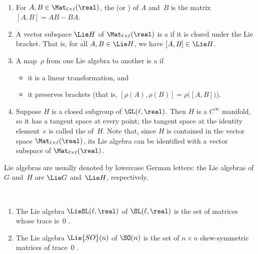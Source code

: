 \begin{defns} \ 
\noprelistbreak
	\begin{enumerate}

	\item For $A,B \in \Mat_{\ell \times \ell}(\real)$, the  (or ) of $A$ and~$B$ is the matrix
		$ [A,B] = AB - BA $.
	\item A vector subspace $\Lie H$ of $\Mat_{\ell \times \ell}(\real)$ is a  if it is closed under the Lie bracket. That is, for all $A,B \in \Lie H$, we have $[A,B] \in \Lie H$.
	\item A map~$\rho$ from one Lie algebra to another is a 
	if
		\begin{itemize}
		\item it is a linear transformation,
		and
		\item it preserves brackets (that is, $[\rho(A), \rho(B)] = \rho \bigl( [A,B] \bigr)$).
		\end{itemize}
	\item Suppose $H$ is a closed subgroup of $\GL(\ell,\real)$. Then $H$ is a $C^\infty$ manifold, so it has a tangent space at every point; the tangent space at the identity element~$e$ is called the  of~$H$. Note that, since $H$ is contained in the vector space $\Mat_{\ell \times \ell}(\real)$, its Lie algebra can be identified with a vector subspace of $\Mat_{\ell \times \ell}(\real)$.
	\end{enumerate}
\end{defns}

\begin{notation}
Lie algebras are usually denoted by lowercase German letters: the Lie algebras of $G$ and~$H$ are 
	\nindex{$\Lie G$, $\Lie H$ = Lie algebras of $G$ and~$H$}%
$\Lie G$ and~$\Lie H$, respectively.
\end{notation}

\begin{egs} \label{LieAlgEgs} \ 
\noprelistbreak
	\begin{enumerate}
	
	
	\item \label{LieAlgEgs-SL}
	The Lie algebra $\LieSL(\ell,\real)$ of $\SL(\ell,\real)$ is the set of matrices whose trace is~$0$ .
	
	\item \label{LieAlgEgs-SO}
	The Lie algebra $\Lie{SO}(n)$ of $\SO(n)$ is the set of $n \times n$ skew-symmetric matrices of trace~$0$ .

	
	\end{enumerate}
\end{egs}

